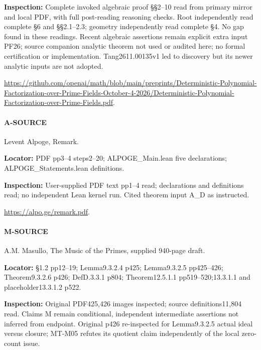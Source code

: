 \documentclass[11pt,a4paper]{article}
\begin{document}
\textbf{Inspection:} Complete invoked algebraic proof §§2–\allowbreak{}10 read from primary mirror and local PDF, with full post-reading reasoning checks.\allowbreak{} Root independently read complete §6 and §§2.\allowbreak{}1–\allowbreak{}2.\allowbreak{}3; geometry independently read complete §4.\allowbreak{} No gap found in these readings.\allowbreak{} Recent algebraic assertions remain explicit extra input PF26; source companion analytic theorem not used or audited here; no formal certification or implementation.\allowbreak{} Tang2611.\allowbreak{}00135v1 led to discovery but its newer analytic inputs are not adopted.\allowbreak{}

\url{https://github.com/openai/math/blob/main/preprints/Deterministic-Polynomial-Factorization-over-Prime-Fields-October-4-2026/Deterministic-Polynomial-Factorization-over-Prime-Fields.pdf}.

\paragraph{A-SOURCE} Levent Alpoge, Remark.

\textbf{Locator:} PDF pp3–\allowbreak{}4 steps2–\allowbreak{}20; ALPOGE\_\allowbreak{}Main.\allowbreak{}lean five declarations; ALPOGE\_\allowbreak{}Statements.\allowbreak{}lean definitions.

\textbf{Inspection:} User-supplied PDF text pp1–\allowbreak{}4 read; declarations and definitions read; no independent Lean kernel run.\allowbreak{} Cited theorem input A\_\allowbreak{}D as instructed.\allowbreak{}

\url{https://alpo.ge/remark.pdf}.

\paragraph{M-SOURCE} A.\allowbreak{}M.\allowbreak{} Masullo, The Music of the Primes, supplied 940-page draft.

\textbf{Locator:} §1.\allowbreak{}2 pp12–\allowbreak{}19; Lemma9.\allowbreak{}3.\allowbreak{}2.\allowbreak{}4 p425; Lemma9.\allowbreak{}3.\allowbreak{}2.\allowbreak{}5 pp425–\allowbreak{}426; Theorem9.\allowbreak{}3.\allowbreak{}2.\allowbreak{}6 p426; DefD.\allowbreak{}3.\allowbreak{}3.\allowbreak{}1 p804; Theorem12.\allowbreak{}5.\allowbreak{}1.\allowbreak{}1 pp519–\allowbreak{}520;13.\allowbreak{}3.\allowbreak{}1.\allowbreak{}1 and placeholder13.\allowbreak{}3.\allowbreak{}1.\allowbreak{}2 p522.

\textbf{Inspection:} Original PDF425,426 images inspected; source definitions11,804 read.\allowbreak{} Claims M remain conditional, independent intermediate assertions not inferred from endpoint.\allowbreak{} Original p426 re-inspected for Lemma9.\allowbreak{}3.\allowbreak{}2.\allowbreak{}5 actual ideal versus closure; MT-M05 refutes its quotient claim independently of the local zero-count issue.\allowbreak{}
\end{document}
